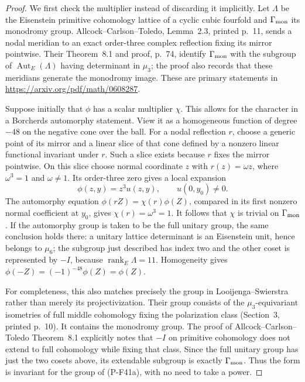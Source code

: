 \begin{proof}
We first check the multiplier instead of discarding it implicitly.
Let $\Lambda$ be the Eisenstein primitive cohomology lattice of
a cyclic cubic fourfold and $\Gamma_{\rm mon}$ its monodromy group.
Allcock--Carlson--Toledo, Lemma~2.3, printed p.~11, sends a
nodal meridian to an exact order-three complex reflection fixing
its mirror pointwise. Their Theorem~8.1 and proof, p.~74,
identify $\Gamma_{\rm mon}$ with the subgroup of
$\operatorname{Aut}_E(\Lambda)$ having determinant in $\mu_3$;
the proof also records that these meridians generate the
monodromy image. These are primary statements in
\url{https://arxiv.org/pdf/math/0608287}.

Suppose initially that $\phi$ has a scalar multiplier $\chi$.
This allows for the character in a Borcherds automorphy statement.
View it as a homogeneous function of degree $-48$ on the
negative cone over the ball. For a nodal reflection $r$, choose
a generic point of its mirror and a linear slice of that cone
defined by a nonzero linear functional invariant under $r$.
Such a slice exists because $r$ fixes the mirror pointwise.
On this slice choose normal coordinate $z$ with
$r(z)=\omega z$, where $\omega^3=1$ and $\omega\ne1$.
Its order-three zero gives a local expansion
\[
               \phi(z,y)=z^3 u(z,y),\qquad u(0,y_0)\ne0.
\]
The automorphy equation $\phi(rZ)=\chi(r)\phi(Z)$,
compared in its first nonzero normal coefficient at $y_0$,
gives $\chi(r)=\omega^3=1$. It follows that
$\chi$ is trivial on $\Gamma_{\rm mon}$.
If the automorphy group is taken to be the full unitary group,
the same conclusion holds there: a unitary lattice determinant
is an Eisenstein unit, hence belongs to $\mu_6$; the subgroup
just described has index two and the other coset is represented
by $-I$, because $\operatorname{rank}_E\Lambda=11$.
Homogeneity gives $\phi(-Z)=(-1)^{-48}\phi(Z)=\phi(Z)$.

For completeness, this also matches precisely the group in
Looijenga--Swierstra rather than merely its projectivization.
Their group consists of the $\mu_3$-equivariant isometries
of full middle cohomology fixing the polarization class
(Section~3, printed p.~10). It contains the monodromy group.
The proof of Allcock--Carlson--Toledo Theorem~8.1 explicitly
notes that $-I$ on primitive cohomology does not extend to
full cohomology while fixing that class. Since the full
unitary group has just the two cosets above, its extendable
subgroup is exactly $\Gamma_{\rm mon}$. Thus the form is
invariant for the group of (P-F41a), with no need to take a power.


\end{proof}

